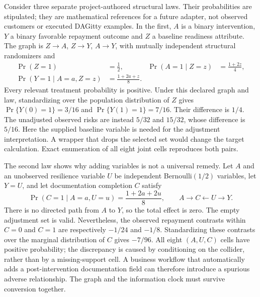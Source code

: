 Consider three separate project-authored structural laws. Their probabilities
are stipulated; they are mathematical references for a future adapter, not
observed customers or executed DAGitty examples. In the first, \(A\) is a
binary intervention, \(Y\) a binary favorable repayment outcome and \(Z\) a
baseline readiness attribute. The graph is \(Z\to A\), \(Z\to Y\),
\(A\to Y\), with mutually independent structural randomizers and
\begin{equation}
\label{exec18:gp-confounding}
 \begin{aligned}
 \Pr(Z=1)&=\frac12, &
 \Pr(A=1\mid Z=z)&=\frac{1+2z}{4},\\
 \Pr(Y=1\mid A=a,Z=z)&=\frac{1+2a+z}{8}.
 \end{aligned}
\end{equation}
Every relevant treatment probability is positive. Under this declared graph
and law, standardizing over the population distribution of \(Z\) gives
\(\Pr\{Y(0)=1\}=3/16\) and \(\Pr\{Y(1)=1\}=7/16\). Their difference is
\(1/4\). The unadjusted observed risks are instead \(5/32\) and \(15/32\),
whose difference is \(5/16\). Here the supplied baseline variable is needed
for the adjustment interpretation. A wrapper that drops the selected set
would change the target calculation. Exact enumeration of all eight joint
cells reproduces both pairs. \citep{exec18_gp_graph_reference}

The second law shows why adding variables is not a universal remedy. Let
\(A\) and an unobserved resilience variable \(U\) be independent
Bernoulli\((1/2)\) variables, let \(Y=U\), and let documentation completion
\(C\) satisfy
\begin{equation}
\label{exec18:gp-collider}
 \Pr(C=1\mid A=a,U=u)=\frac{1+2a+2u}{8},
 \qquad A\to C\leftarrow U\to Y.
\end{equation}
There is no directed path from \(A\) to \(Y\), so the total effect is zero.
The empty adjustment set is valid. Nevertheless, the observed repayment
contrasts within \(C=0\) and \(C=1\) are respectively \(-1/24\) and
\(-1/8\). Standardizing these contrasts over the marginal distribution
of \(C\) gives \(-7/96\). All eight \((A,U,C)\) cells have positive probability;
the discrepancy is caused by conditioning on the collider, rather than by
a missing-support cell. A business workflow that automatically adds a
post-intervention documentation field can therefore introduce a spurious
adverse relationship. The graph and the information clock must survive
conversion together. \citep{exec18_gp_graph_reference}

